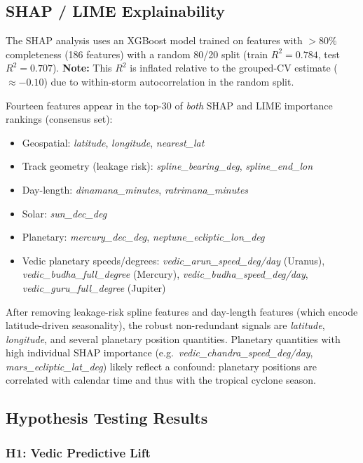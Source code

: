 \documentclass[12pt,a4paper]{article}
\begin{document}
\subsection{SHAP / LIME Explainability}
\label{sec:shap}

The SHAP analysis uses an XGBoost model trained on features with $> 80\%$
completeness (186 features) with a random 80/20 split (train $R^2 = 0.784$,
test $R^2 = 0.707$).
\textbf{Note:} This $R^2$ is inflated relative to the grouped-CV estimate
($\approx -0.10$) due to within-storm autocorrelation in the random split.

Fourteen features appear in the top-30 of \emph{both} SHAP and LIME importance
rankings (consensus set):

\begin{itemize}
  \item Geospatial: \textit{latitude}, \textit{longitude}, \textit{nearest\_lat}
  \item Track geometry (leakage risk): \textit{spline\_bearing\_deg}, \textit{spline\_end\_lon}
  \item Day-length: \textit{dinamana\_minutes}, \textit{ratrimana\_minutes}
  \item Solar: \textit{sun\_dec\_deg}
  \item Planetary: \textit{mercury\_dec\_deg}, \textit{neptune\_ecliptic\_lon\_deg}
  \item Vedic planetary speeds/degrees: \textit{vedic\_arun\_speed\_deg/day}
        (Uranus), \textit{vedic\_budha\_full\_degree} (Mercury),
        \textit{vedic\_budha\_speed\_deg/day}, \textit{vedic\_guru\_full\_degree} (Jupiter)
\end{itemize}

After removing leakage-risk spline features and day-length features
(which encode latitude-driven seasonality), the robust non-redundant signals
are \emph{latitude}, \emph{longitude}, and several planetary position quantities.
Planetary quantities with high individual SHAP importance
(e.g.\ \textit{vedic\_chandra\_speed\_deg/day}, \textit{mars\_ecliptic\_lat\_deg})
likely reflect a confound: planetary positions are correlated with calendar time
and thus with the tropical cyclone season.

\subsection{Hypothesis Testing Results}
\label{sec:hypotheses}

\subsubsection{H1: Vedic Predictive Lift}
\end{document}
